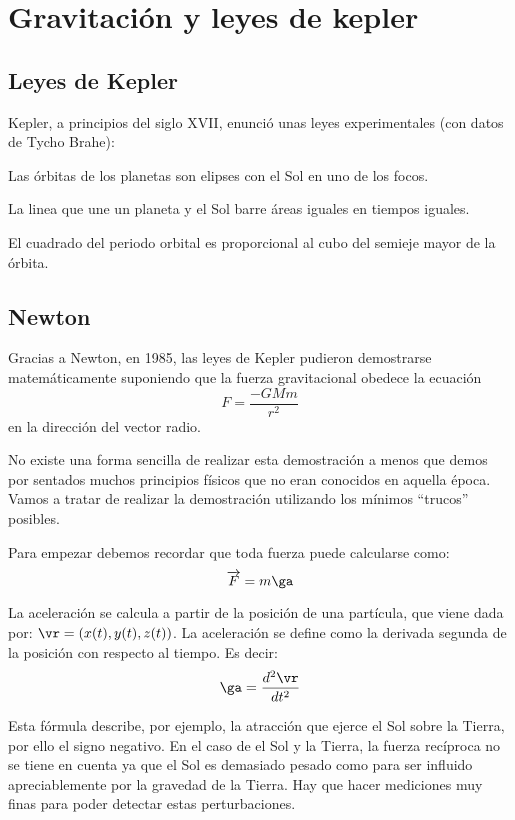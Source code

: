 \chapter{Gravitación y leyes de kepler}
\section{Leyes de Kepler}

Kepler, a principios del siglo XVII, enunció unas leyes experimentales (con datos de Tycho Brahe):

\begin{lemma}
	Las órbitas de los planetas son elipses con el Sol en uno de los focos.
\end{lemma}

\begin{lemma}
	La linea que une un planeta y el Sol barre áreas iguales en tiempos iguales.
\end{lemma}

\begin{lemma}
	El cuadrado del periodo orbital es proporcional al cubo del semieje mayor de la órbita.
\end{lemma}

\section{Newton}

Gracias a Newton, en 1985, las leyes de Kepler pudieron demostrarse matemáticamente suponiendo que la fuerza gravitacional obedece la ecuación
\[ F = \frac{-GMm}{r^2} \]
en la dirección del vector radio.

No existe una forma sencilla de realizar esta demostración a menos que demos por sentados muchos principios físicos que no eran conocidos en aquella época. Vamos a tratar de realizar la demostración utilizando los mínimos ``trucos'' posibles.

Para empezar debemos recordar que toda fuerza puede calcularse como:
$$ \overrightarrow{F} = m\ga$$

La aceleración se calcula a partir de la posición de una partícula, que viene dada por: $\vr = (x(t), y(t), z(t))$. La aceleración se define como la derivada segunda de la posición con respecto al tiempo. Es decir:
\[ \ga = \frac{d^2\vr}{d t^2} \]

Esta fórmula describe, por ejemplo, la atracción que ejerce el Sol sobre la Tierra, por ello el signo negativo. En el caso de el Sol y la Tierra, la fuerza recíproca no se tiene en cuenta ya que el Sol es demasiado pesado como para ser influido apreciablemente por la gravedad de la Tierra. Hay que hacer mediciones muy finas para poder detectar estas perturbaciones.

